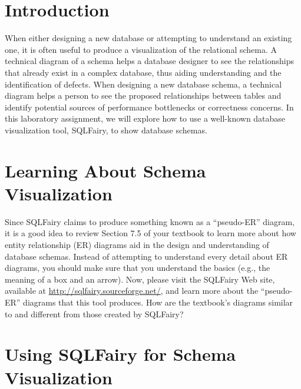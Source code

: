 


\usepackage[compact]{titlesec}



\section*{Introduction}

When either designing a new database or attempting to understand an existing one, it is often useful to produce a
visualization of the relational schema.  A technical diagram of a schema helps a database designer to see the
relationships that already exist in a complex database, thus aiding understanding and the identification of defects.
When designing a new database schema, a technical diagram helps a person to see the proposed relationships between
tables and identify potential sources of performance bottlenecks or correctness concerns. In this laboratory assignment,
we will explore how to use a well-known database visualization tool, SQLFairy, to show database schemas.

\vspace*{-.05in}
\section*{Learning About Schema Visualization}

Since SQLFairy claims to produce something known as a ``pseudo-ER'' diagram, it is a good idea to review Section 7.5 of
your textbook to learn more about how entity relationship (ER) diagrams aid in the design and understanding of database
schemas. Instead of attempting to understand every detail about ER diagrams, you should make sure that you understand
the basics (e.g., the meaning of a box and an arrow). Now, please visit the SQLFairy Web site, available at
\url{http://sqlfairy.sourceforge.net/}, and learn more about the ``pseudo-ER'' diagrams that this tool produces. How are
the textbook's diagrams similar to and different from those created by SQLFairy?

\vspace*{-.05in}
\section*{Using SQLFairy for Schema Visualization}

